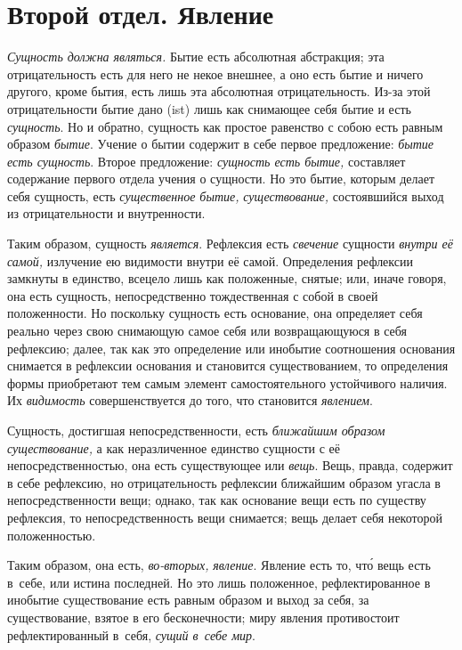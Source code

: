 \part[{\em Второй отдел} Явление]{Второй отдел. Явление}

{\em Сущность должна являться.}
Бытие есть абсолютная абстракция; эта отрицательность есть для него не некое
внешнее, а оно есть бытие и ничего другого, кроме бытия, есть лишь эта
абсолютная отрицательность. Из-за этой отрицательности бытие дано (ist)
лишь как снимающее себя бытие и есть {\em сущность}. Но
и обратно, сущность как простое равенство с собою есть равным образом
{\em бытие}. Учение о бытии содержит в себе первое
предложение: {\em бытие есть сущность}. Второе
предложение: {\em сущность есть бытие,} составляет
содержание первого отдела учения о сущности. Но это бытие, которым делает
себя сущность, есть {\em существенное бытие,}
{\em существование,} состоявшийся выход из
отрицательности и внутренности.

Таким образом, сущность {\em является}. Рефлексия есть
{\em свечение} сущности {\em внутри
её самой,} излучение ею видимости внутри её самой. Определения рефлексии
замкнуты в единство, всецело лишь как положенные, снятые; или, иначе
говоря, она есть сущность, непосредственно тождественная с собой в своей
положенности. Но поскольку сущность есть основание, она определяет себя
реально через свою снимающую самое себя или возвращающуюся в себя
рефлексию; далее, так как это определение или инобытие соотношения
основания снимается в рефлексии основания и становится существованием, то
определения формы приобретают тем самым элемент самостоятельного
устойчивого наличия. Их {\em видимость}
совершенствуется до того, что становится {\em явлением}.

Сущность, достигшая непосредственности, есть
{\em ближайшим образом существование,} а как
неразличенное единство сущности с её непосредственностью, она есть
существующее или {\em вещь}. Вещь, правда, содержит в
себе рефлексию, но отрицательность рефлексии ближайшим образом угасла в
непосредственности вещи; однако, так как основание вещи есть по существу
рефлексия, то непосредственность вещи снимается; вещь делает себя некоторой
положенностью.

Таким образом, она есть, {\em во-вторых,}
{\em явление}. Явление есть то, чт\'{о} вещь есть в~себе,
или истина последней. Но это лишь положенное, рефлектированное в инобытие
существование есть равным образом и выход за себя, за существование, взятое
в его бесконечности; миру явления противостоит рефлектированный в~себя,
{\em сущий в~себе мир}.

